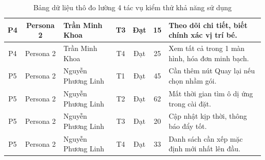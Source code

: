 \begin{table}[H]
\begin{tabularx}{\textwidth}{|c|c|l|c|c|c|X|}
    P4 & Persona 2 & Trần Minh Khoa & T3 & Đạt & 15 & Theo dõi chi tiết, biết chính xác vị trí bé. \\ \hline
    P4 & Persona 2 & Trần Minh Khoa & T4 & Đạt & 25 & Xem tất cả trong 1 màn hình, hóa đơn minh bạch. \\ \hline
    P5 & Persona 2 & Nguyễn Phương Linh & T1 & Đạt & 45 & Cần thêm nút Quay lại nếu chọn nhầm gói. \\ \hline
    P5 & Persona 2 & Nguyễn Phương Linh & T2 & Đạt & 62 & Mất thời gian tìm ô dị ứng trong cài đặt. \\ \hline
    P5 & Persona 2 & Nguyễn Phương Linh & T3 & Đạt & 20 & Cập nhật kịp thời, thông báo đẩy tốt. \\ \hline
    P5 & Persona 2 & Nguyễn Phương Linh & T4 & Đạt & 33 & Danh sách cần xếp mặc định mới nhất lên đầu. \\ \hline
  \end{tabularx}
  \caption{Bảng dữ liệu thô đo lường 4 tác vụ kiểm thử khả năng sử dụng}
  \label{tab:raw_task_data}
\end{table}

